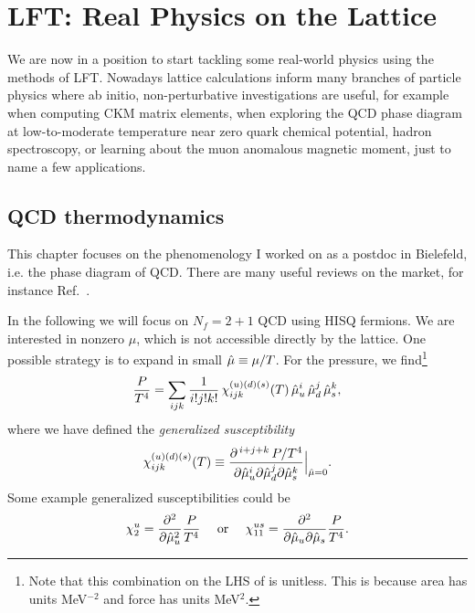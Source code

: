 \chapter{LFT: Real Physics on the Lattice}\label{ch:realPhys}

We are now in a position to start tackling some real-world physics using the
methods of LFT. Nowadays lattice calculations inform many branches of particle
physics where ab initio, non-perturbative investigations are useful, for example
when computing CKM matrix elements, when exploring the QCD phase diagram at
low-to-moderate temperature near zero quark chemical potential, hadron
spectroscopy, or learning about the muon anomalous magnetic moment, just to name
a few applications.

\section{QCD thermodynamics}\label{sec:QCDtherm} 

This chapter focuses on the phenomenology I worked on as a postdoc in
Bielefeld, i.e. the phase diagram of QCD. There are many useful reviews
on the market, for instance Ref.~\cite{ding_thermodynamics_2015}.

In the following we will focus on $N_f=2+1$ QCD using HISQ fermions. We are
interested in nonzero $\mu$, which is not accessible directly by the lattice.
One possible strategy is to expand in small $\hat{\mu}\equiv\mu/T$. For the
pressure, we find\footnote{Note that this combination on the LHS of 
 is unitless. This is because area has units
MeV$^{-2}$ and force has units MeV$^2$.}
\begin{equation}\label{eq:pxpac}
\frac{P}{T^4}=\sum_{ijk}\frac{1}{i!j!k!}\,\chi_{ijk}^{(u)(d)(s)}(T)\,
               \hat{\mu}_u^i\,\hat{\mu}_d^j\,\hat{\mu}_s^k,
\end{equation}
where we have defined the {\it generalized
susceptibility}
\begin{equation}
\chi_{ijk}^{(u)(d)(s)}(T)
  \equiv\frac{\partial^{\,i+j+k}\,P/T^4}{\partial\hat{\mu}_u^i\partial\hat{\mu}_d^j
                                       \partial\hat{\mu}_s^k}\Big|_{\hat{\mu}=0}.
\end{equation}
Some example generalized susceptibilities could be
\begin{equation}
  \chi_2^u=\frac{\partial^2}{\partial\hat{\mu}_u^2}\frac{P}{T^4}
  ~~~~\text{or}~~~~
  \chi_{11}^{us}=\frac{\partial^2}{\partial\hat{\mu}_u\partial\hat{\mu}_s}\frac{P}{T^4}.
\end{equation}

